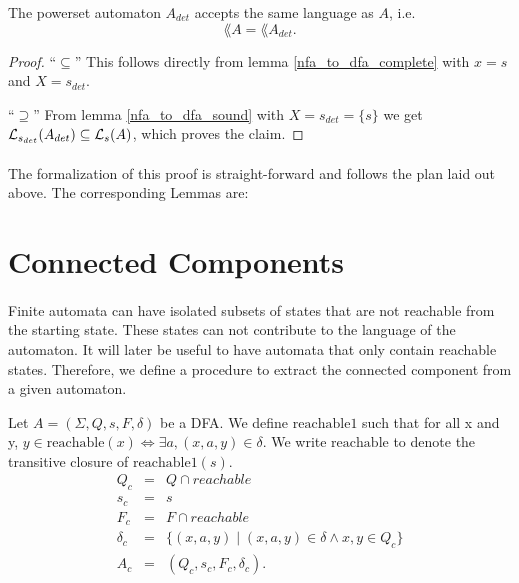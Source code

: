     \begin{theorem}
        The powerset automaton $A_{det}$ accepts the same language as $A$, i.e.
        \begin{equation*}        
            \lang{A} = \lang{A_{det}}.        
        \end{equation*}
    \end{theorem}
    \begin{proof}
        ``$\subseteq$'' 
        This follows directly from lemma \ref{nfa_to_dfa_complete} with $x = s$ and $X = {s}_{det}$.

        ``$\supseteq$''
        From lemma \ref{nfa_to_dfa_sound} with $X = {s}_{det} = \{s\}$ we get 
        $\mathcal{L}_{s_{det}}(A_{det}) \subseteq \mathcal{L}_{s}(A)$, which proves the claim.
    \end{proof}

    \paragraph{}
    The formalization of this proof is straight-forward and follows the plan laid out above. 
    The corresponding Lemmas are:


    \section{Connected Components}
    \paragraph{} 
    Finite automata can have isolated subsets of states that are not reachable from the starting state. 
    These states can not contribute to the language of the automaton. 
    It will later be useful to have automata that only contain reachable states. 
    Therefore, we define a procedure to extract the connected component from a given automaton.

    \begin{definition}
        Let $A = (\Sigma, Q, s, F, \delta)$ be a DFA.
        We define $\mathrm{reachable1}$ such that for all x and y, 
        $y \in \mathrm{reachable}(x) \iff \exists a, (x,a,y) \in \delta$.
        We write $\mathrm{reachable}$ to denote the transitive closure of $\mathrm{reachable1}(s)$.
        \begin{eqnarray*}
            Q_c & = & Q \cap reachable \\
            s_c & = & s \\
            F_c & = & F \cap reachable \\
            \delta_c & = & \{(x, a, y) \; | \; (x, a, y) \in \delta \wedge x,y \in Q_c \} \\
            A_c &=& (Q_c, s_c, F_c, \delta_c).
        \end{eqnarray*}
    \end{definition}


